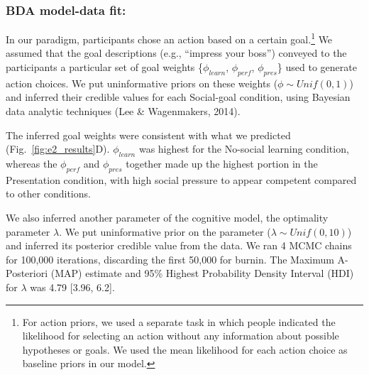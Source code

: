 \documentclass[10pt, letterpaper]{article}
\begin{document}
\subsubsection{BDA model-data fit:}\label{bda-model-data-fit}

In our paradigm, participants chose an action based on a certain
goal.\footnote{For action priors, we used a separate task in which people indicated the likelihood for selecting an action without any information about possible hypotheses or goals. We used the mean likelihood for each action choice as baseline priors in our model.}
We assumed that the goal descriptions (e.g., ``impress your boss'')
conveyed to the participants a particular set of goal weights
\{\(\phi_{learn}\), \(\phi_{perf}\), \(\phi_{pres}\)\} used to generate
action choices. We put uninformative priors on these weights
(\(\phi \sim Unif(0,1)\)) and inferred their credible values for each
Social-goal condition, using Bayesian data analytic techniques (Lee \&
Wagenmakers, 2014).

The inferred goal weights were consistent with what we predicted
(Fig.~\ref{fig:e2_results}D). \(\phi_{learn}\) was highest for the
No-social learning condition, whereas the \(\phi_{perf}\) and
\(\phi_{pres}\) together made up the highest portion in the Presentation
condition, with high social pressure to appear competent compared to
other conditions.

We also inferred another parameter of the cognitive model, the
optimality parameter \(\lambda\). We put uninformative prior on the
parameter (\(\lambda \sim Unif(0,10)\)) and inferred its posterior
credible value from the data. We ran 4 MCMC chains for 100,000
iterations, discarding the first 50,000 for burnin. The Maximum A-
Posteriori (MAP) estimate and 95\% Highest Probability Density Interval
(HDI) for \(\lambda\) was 4.79 {[}3.96, 6.2{]}.
\end{document}
